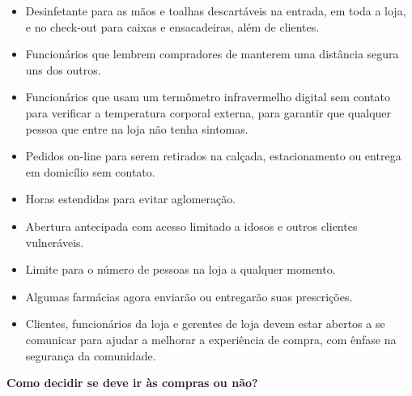 \documentclass[onecolumn,journal]{IEEEtran}
\begin{document}
\begin{multicols}{2}
\vspace{2ex}

\begin{itemize}
    \item Desinfetante para as mãos e toalhas descartáveis na entrada, em toda a loja, e no check-out para caixas e ensacadeiras, além de clientes.
    \item Funcionários que lembrem compradores de manterem uma distância segura uns dos outros.
    \item Funcionários que usam um termômetro infravermelho digital sem contato para verificar a temperatura corporal externa, para garantir que qualquer pessoa que entre na loja não tenha sintomas.
    \item Pedidos on-line para serem retirados na calçada, estacionamento ou entrega em domicílio sem contato.
    \item Horas estendidas para evitar aglomeração.
    \item Abertura antecipada com acesso limitado a idosos e outros clientes vulneráveis.
    \item Limite para o número de pessoas na loja a qualquer momento.
    \item Algumas farmácias agora enviarão ou entregarão suas prescrições.
    \item Clientes, funcionários da loja e gerentes de loja devem estar abertos a se comunicar para ajudar a melhorar a experiência de compra, com ênfase na segurança da comunidade.
\end{itemize}

\vspace{2ex}

\textbf{Como decidir se deve ir às compras ou não?}

\vspace{2ex}


\end{multicols}
\end{document}
